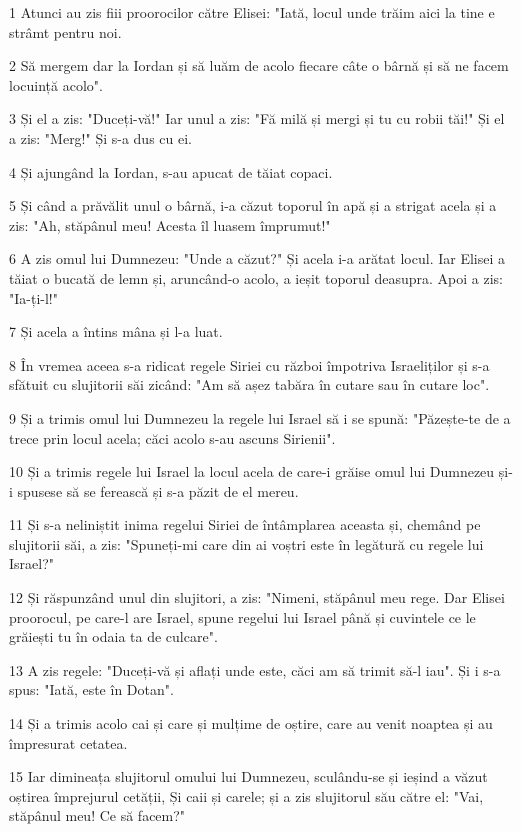 \par 1 Atunci au zis fiii proorocilor către Elisei: "Iată, locul unde trăim aici la tine e strâmt pentru noi.
\par 2 Să mergem dar la Iordan și să luăm de acolo fiecare câte o bârnă și să ne facem locuință acolo".
\par 3 Și el a zis: "Duceți-vă!" Iar unul a zis: "Fă milă și mergi și tu cu robii tăi!" Și el a zis: "Merg!" Și s-a dus cu ei.
\par 4 Și ajungând la Iordan, s-au apucat de tăiat copaci.
\par 5 Și când a prăvălit unul o bârnă, i-a căzut toporul în apă și a strigat acela și a zis: "Ah, stăpânul meu! Acesta îl luasem împrumut!"
\par 6 A zis omul lui Dumnezeu: "Unde a căzut?" Și acela i-a arătat locul. Iar Elisei a tăiat o bucată de lemn și, aruncând-o acolo, a ieșit toporul deasupra. Apoi a zis: "Ia-ți-l!"
\par 7 Și acela a întins mâna și l-a luat.
\par 8 În vremea aceea s-a ridicat regele Siriei cu război împotriva Israeliților și s-a sfătuit cu slujitorii săi zicând: "Am să așez tabăra în cutare sau în cutare loc".
\par 9 Și a trimis omul lui Dumnezeu la regele lui Israel să i se spună: "Păzește-te de a trece prin locul acela; căci acolo s-au ascuns Sirienii".
\par 10 Și a trimis regele lui Israel la locul acela de care-i grăise omul lui Dumnezeu și-i spusese să se ferească și s-a păzit de el mereu.
\par 11 Și s-a neliniștit inima regelui Siriei de întâmplarea aceasta și, chemând pe slujitorii săi, a zis: "Spuneți-mi care din ai voștri este în legătură cu regele lui Israel?"
\par 12 Și răspunzând unul din slujitori, a zis: "Nimeni, stăpânul meu rege. Dar Elisei proorocul, pe care-l are Israel, spune regelui lui Israel până și cuvintele ce le grăiești tu în odaia ta de culcare".
\par 13 A zis regele: "Duceți-vă și aflați unde este, căci am să trimit să-l iau". Și i s-a spus: "Iată, este în Dotan".
\par 14 Și a trimis acolo cai și care și mulțime de oștire, care au venit noaptea și au împresurat cetatea.
\par 15 Iar dimineața slujitorul omului lui Dumnezeu, sculându-se și ieșind a văzut oștirea împrejurul cetății, Și caii și carele; și a zis slujitorul său către el: "Vai, stăpânul meu! Ce să facem?"
